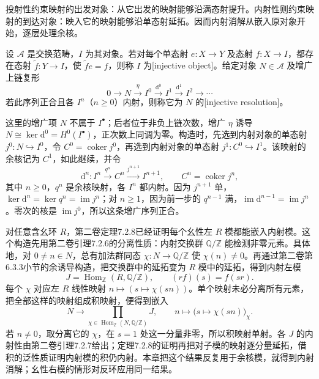 投射性约束映射的出发对象：从它出发的映射能够沿满态射提升。内射性则约束映射的到达对象：映入它的映射能够沿单态射延拓。因而内射消解从嵌入原对象开始，逐层处理余核。

\begin{definition}\label{b4:def:injective-resolution}
	设 \(\mathcal A\) 是交换范畴，\(I\) 为其对象。若对每个单态射 \(e:X\to Y\) 及态射 \(f:X\to I\)，都存在态射 \(\widetilde f:Y\to I\)，使 \(\widetilde f e=f\)，则称 \(I\) 为[injective object]。给定对象 \(N\in\mathcal A\) 及增广上链复形
	\[
		0\longrightarrow N\xrightarrow{\eta}I^0\xrightarrow{\mathrm{d}^0}I^1 \xrightarrow{\mathrm{d}^1}I^2\longrightarrow\cdots
	\]
	若此序列正合且各 \(I^n\)（\(n\ge0\)）内射，则称它为 \(N\) 的[injective resolution]。
\end{definition}

这里的增广项 \(N\) 不属于 \(I^\bullet\)；后者位于非负上链次数，增广 \(\eta\) 诱导 \(N\cong\ker\mathrm{d}^0=H^0(I^\bullet)\)，正次数上同调为零。构造时，先选到内射对象的单态射 \(j^0:N\hookrightarrow I^0\)，令 \(C^0=\operatorname{coker}j^0\)，再选到内射对象的单态射 \(j^1:C^0\hookrightarrow I^1\)。该映射的余核记为 \(C^1\)，如此继续，并令
\[
	\mathrm{d}^n:I^n\xrightarrow{q^n}C^n\xrightarrow{j^{n+1}}I^{n+1}, \qquad C^n=\operatorname{coker}j^n,
\]
其中 \(n\ge0\)，\(q^n\) 是余核映射，各 \(I^n\) 都内射。因为 \(j^{n+1}\) 单，\(\ker\mathrm{d}^n=\ker q^n=\operatorname{im}j^n\)；对 \(n\ge1\)，因为前一步的 \(q^{n-1}\) 满，\(\operatorname{im}\mathrm{d}^{n-1}=\operatorname{im}j^n\)。零次的核是 \(\operatorname{im}j^0\)，所以这条增广序列正合。

\ProseParagraphBreak
对任意含幺环 \(R\)，第二卷定理7.2.8已经证明每个幺性左 \(R\) 模都能嵌入内射模。这个构造先用第二卷引理7.2.6的分离性质：内射交换群 \(\mathbb Q/\mathbb Z\) 能检测非零元素。具体地，对 \(0\ne n\in N\)，总有加法群同态 \(\chi:N\to\mathbb Q/\mathbb Z\) 使 \(\chi(n)\ne0\)。再通过第二卷第6.3.3小节的余诱导构造，把交换群中的延拓变为 \(R\) 模中的延拓，得到内射左模
\[
	J=\operatorname{Hom}_{\mathbb Z}(R,\mathbb Q/\mathbb Z), \qquad (rf)(s)=f(sr).
\]
每个 \(\chi\) 对应左 \(R\) 线性映射 \(n\mapsto(s\mapsto\chi(sn))\)。单个映射未必分离所有元素，把全部这样的映射组成积映射，便得到嵌入
\[
	N\longrightarrow\prod_{\chi\in\operatorname{Hom}_{\mathbb Z}(N,\mathbb Q/\mathbb Z)}J, \qquad n\longmapsto\bigl(s\longmapsto\chi(sn)\bigr)_\chi.
\]
若 \(n\ne0\)，取分离它的 \(\chi\)，在 \(s=1\) 处这一分量非零，所以积映射单射。各 \(J\) 的内射性由第二卷引理7.2.7给出；定理7.2.8的证明再把对子模的映射逐分量延拓，借积的泛性质证明内射模的积仍内射。本章把这个结果反复用于余核模，就得到内射消解；幺性右模的情形对反环应用同一结果。

